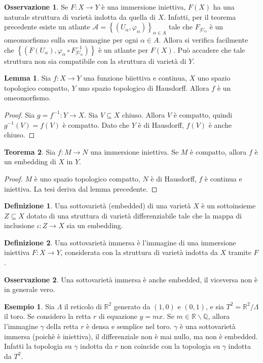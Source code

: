 \documentclass[a4paper,11pt]{article}
\theoremstyle{definition}
\newtheorem{osservazione}{Osservazione}[section]
\newtheorem{definizione}{Definizione}[section]
\newtheorem{esempio}{Esempio}[section]
\theoremstyle{theorem}
\newtheorem{teorema}{Teorema}[section]
\newtheorem{lemma}[teorema]{Lemma}
\begin{document}
\begin{osservazione}
	Se $F\colon X\to Y$ è una immersione iniettiva, $F(X)$ ha una naturale struttura di varietà indotta da quella di $X$. Infatti, per il teorema precedente esiste un atlante $\mathcal{A}=\left\{(U_\alpha,\varphi_\alpha)\right\}_{\alpha\in A}$ tale che $F_{|U_\alpha}$ è un omeomorfismo sulla sua immagine per ogni $\alpha\in A$. Allora si verifica facilmente che $\left\{\left(F(U_{\alpha}),\varphi_\alpha\circ F^{-1}_{|U_{\alpha}}\right)\right\}$ è un atlante per $F(X)$. Può accadere che tale struttura non sia compatibile con la struttura di varietà di $Y$.
\end{osservazione}
\begin{lemma}
	Sia $f\colon X\to Y$ una funzione biiettiva e continua, $X$ uno spazio topologico compatto, $Y$ uno spazio topologico di Hausdorff. Allora $f$ è un omeomorfismo.
\end{lemma}
\begin{proof}
	Sia $g=f^{-1}\colon Y\to X$. Sia $V\subseteq X$ chiuso. Allora $V$ è compatto, quindi $g^{-1}(V)=f(V)$ è compatto. Dato che $Y$ è di Hausdorff, $f(V)$ è anche chiuso.
\end{proof}
\begin{teorema}
	Sia $f\colon M\to N$ una immersione iniettiva. Se $M$ è compatto, allora $f$ è un embedding di $X$ in $Y$.
\end{teorema}
\begin{proof}
	$M$ è uno spazio topologico compatto, $N$ è di Hausdorff, $f$ è continua e iniettiva. La tesi deriva dal lemma precedente.
\end{proof}
\begin{definizione}
	Una sottovarietà (embedded) di una varietà $X$ è un sottoinsieme $Z\subseteq X$ dotato di una struttura di varietà differenziabile tale che la mappa di inclusione $\iota\colon Z\to X$ sia un embedding.
\end{definizione}
\begin{definizione}
	Una sottovarietà immersa è l'immagine di una immersione iniettiva $F\colon X\to Y$, considerata con la struttura di varietà indotta da $X$ tramite $F$.
\end{definizione}
\begin{osservazione}
	Una sottovarietà immersa è anche embedded, il viceversa non è in generale vero.
\end{osservazione}
\begin{esempio}
	Sia $\Lambda$ il reticolo di $\mathbb{R}^2$ generato da $(1,0)$ e $(0,1)$, e sia $T^2=\mathbb{R}^2\slash\Lambda$ il toro. Se considero la retta $r$ di equazione $y=mx$. Se $m\in\mathbb{R}\backslash\mathbb{Q}$, allora l'immagine $\gamma$ della retta $r$ è densa e semplice nel toro. $\gamma$ è una sottovarietà immersa (poichè è iniettiva), il differenziale non è mai nullo, ma non è embedded. Infatti la topologia su $\gamma$ indotta da $r$ non coincide con la topologia su $\gamma$ indotta da $T^2$.
\end{esempio}
\end{document}
